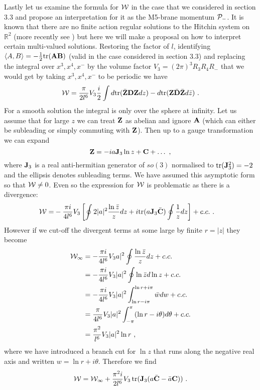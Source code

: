 \documentclass[12pt]{article}
\newcommand{\tr}{\operatorname{tr}}
\newcommand{\nn}{\nonumber}
\numberwithin{equation}{section}
\begin{document}
 
Lastly let us examine the formula for ${\cal W}$ in the case that we considered in section 3.3 and propose an interpretation for it as the M5-brane momentum ${\cal P}_-$.  It is known that there are no finite action regular solutions to the Hitchin system on ${\mathbb R}^2$ \cite{Saclioglu} (more recently see  \cite{Ward}) but here we will make a proposal on how to interpret certain multi-valued solutions.
Restoring the factor of $l$, identifying $\langle A,B\rangle = -\frac12{\rm tr}({\bf A}{\bf B})$ (valid in the case considered in section 3.3) and replacing the integral over $x^3,x^4,x^-$ by the volume factor 
$V_3=(2\pi)^3R_3R_4R_-$ that we would get by taking $x^3,x^4,x^-$ to be periodic we have
\begin{equation}
{\cal W} = \frac{\pi  }{2l^6}V_3\frac{i}{2}\int d{\rm tr}(\bar {\bf Z}{\bf D}{\bf Z}dz)  - d{\rm tr}({\bf Z}\bar {\bf D}\bar {\bf Z}d\bar z) \ .
\end{equation}
For a smooth solution the integral is only over the sphere at infinity. Let us assume
that for large $z$ we can treat ${\bf Z}$ as abelian and ignore ${\bf A}$ (which can either be subleading or simply commuting with ${\bf Z}$). Then up to a gauge transformation we can expand
\begin{equation}
{\bf Z} =  -i{a}    {\bf J}_3\ln z + {\bf C} + \dots\ ,
\end{equation}
where ${\bf J}_3$ is a real anti-hermitian generator of ${so}(3)$ normalised to ${\rm tr}({\bf J}_3^2)=-2$ and the ellipsis denotes subleading terms. We have assumed this asymptotic form so that ${\cal W}\ne 0$. Even so the expression for ${\cal W}$ is  problematic as there is a divergence:
\begin{align}
{\cal W} = &-\frac{\pi i}{4l^6}V_3\left[\oint 2|a|^2 \frac{\ln \bar z}{z}dz +i   {\rm tr}(a{\bf J}_3\bar {\bf C})\oint\frac{1}{z} dz \right]+c.c.\ .
\end{align}
 However if we cut-off the divergent terms at some large by finite $r=|z|$ they become \begin{align}
{\cal W}_\infty & = -\frac{\pi i}{4l^6}V_3a|^2\oint \frac{\ln \bar z}{z} dz +c.c. \nn\\
  & =- \frac{\pi i}{4l^6}V_3|a|^2\oint {\ln \bar z}  d\ln z +c.c.\nn\\
& = -\frac{\pi i}{4l^6}V_3|a|^2\int_{ \ln r -i\pi}^{ \ln r+i\pi} \bar w d w +c.c.\nn\\
& =  \frac{\pi   }{4l^6}V_3|a|^2\int_{-\pi}^{\pi} (\ln r -i\theta) d\theta +c.c. \nn\\
& = \frac{ \pi^2  }{ l^6}V_3 |a|^2\ln r  \ ,
\end{align}
where we have introduced a branch cut for $\ln z$ that runs along the negative real axis and written $w=\ln r + {i\theta}$. 
Therefore we find
 \begin{equation}
 {\cal W} = {\cal W}_\infty+  \frac{\pi^2 i}{ 2l^6}V_3  \tr({\bf J}_3 (a\bar{\bf C}-\bar a{\bf C}))\ .
 \end{equation}
 
\end{document}
